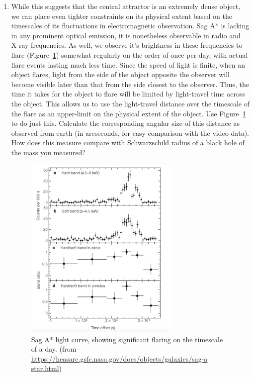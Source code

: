 \begin{enumerate}
\begin{enumerate}
		\item While this suggests that the central attractor is an extremely dense object, we can place
		even tighter constraints on its physical extent based on the timescales of its fluctuations
		in electromagnetic observation. Sag A* is lacking in any prominent optical emission, it is
		nonetheless observable in radio and X-ray frequencies. As well, we observe it’s brightness in
		these frequencies to flare (Figure~\ref{gc:fig:light-curve}) somewhat regularly on the order of once per day, with
		actual flare events lasting much less time. Since the speed of light is finite, when an object
		flares, light from the side of the object opposite the observer will become visible later than
		that from the side closest to the observer. Thus, the time it takes for the object to flare
		will be limited by light-travel time across the object. This allows us to use the light-travel
		distance over the timescale of the flare as an upper-limit on the physical extent of the object.
		Use Figure~\ref{gc:fig:light-curve} to do just this. Calculate the corresponding angular size of this distance as
		observed from earth (in arcseconds, for easy comparison with the video data). How does this
		measure compare with Schwarzschild radius of a black hole of the mass you measured?
		
		\begin{figure}
			\centering
			\includegraphics[width=0.7\textwidth]{galactic-center/sag-a-light-curve.png}
			\caption{Sag A* light curve, showing significant flaring on the timescale of a day.
				(from \url{https://heasarc.gsfc.nasa.gov/docs/objects/galaxies/sag-a star.html})}\label{gc:fig:light-curve}
		\end{figure}
	\end{enumerate}
\end{enumerate}

